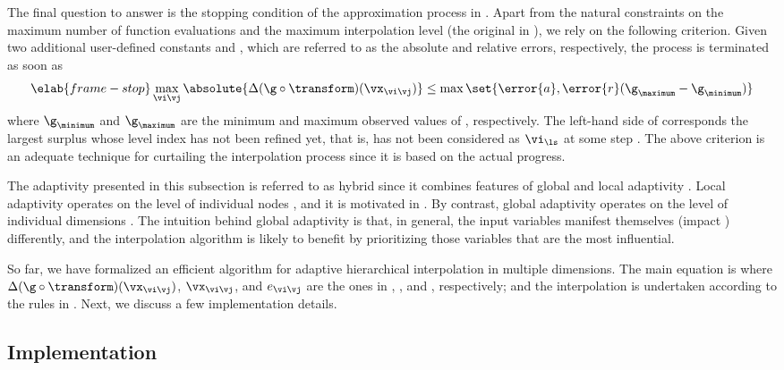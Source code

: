 The final question to answer is the stopping condition of the approximation
process in . Apart from the natural constraints on the
maximum number of function evaluations and the maximum interpolation level (the
original \ls in ), we rely on the following
criterion. Given two additional user-defined constants  and ,
which are referred to as the absolute and relative errors, respectively, the
process is terminated as soon as
\begin{equation} \elab{frame-stop}
  \max_{\vi \vj} \absolute{\Delta(\g \circ \transform)(\vx_{\vi \vj})} \leq \max \set{\error{a}, \error{r} (\g_\maximum - \g_\minimum)}
\end{equation}
where $\g_\minimum$ and $\g_\maximum$ are the minimum and maximum observed
values of \g, respectively. The left-hand side of  corresponds
the largest surplus whose level index has not been refined yet, that is, has not
been considered as $\vi_{\ls}$ at some step \ls. The above criterion is an
adequate technique for curtailing the interpolation process since it is based on
the actual progress.

The adaptivity presented in this subsection is referred to as hybrid since it
combines features of global and local adaptivity \cite{jakeman2012}. Local
adaptivity operates on the level of individual nodes \cite{ma2009}, and it is
motivated in . By contrast, global adaptivity operates on
the level of individual dimensions \cite{klimke2006}. The intuition behind
global adaptivity is that, in general, the input variables manifest themselves
(impact \g) differently, and the interpolation algorithm is likely to benefit by
prioritizing those variables that are the most influential.

\conclusioncut
So far, we have formalized an efficient algorithm for adaptive hierarchical
interpolation in multiple dimensions. The main equation is
 where $\Delta(\g \circ \transform)(\vx_{\vi \vj})$,
$\vx_{\vi \vj}$, and $e_{\vi \vj}$ are the ones in
, , and ,
respectively; and the interpolation is undertaken according to the rules in
. Next, we discuss a few implementation details.

\subsection{Implementation}

